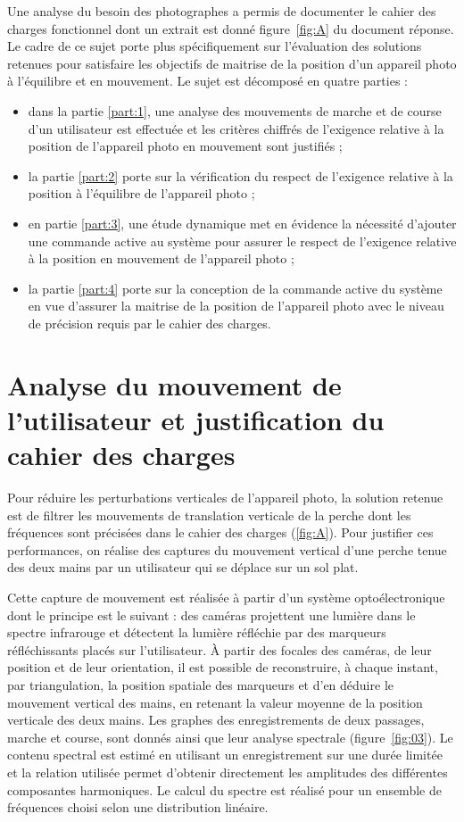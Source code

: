 Une analyse du besoin des photographes a permis de documenter le cahier des charges fonctionnel dont un extrait est donné figure~\ref{fig:A} du document réponse. Le cadre de ce sujet porte plus spécifiquement sur l'évaluation des solutions retenues pour satisfaire les objectifs de maitrise de la position d'un appareil photo à l'équilibre et en mouvement. Le sujet est décomposé en quatre parties :

\begin{itemize}
  \item dans la partie \ref{part:1}, une analyse des mouvements de marche et de course d'un utilisateur est effectuée et les critères chiffrés de l'exigence relative à la position de l'appareil photo en mouvement sont justifiés ;
  \item la partie \ref{part:2} porte sur la vérification du respect de l'exigence relative à la position à l'équilibre de l'appareil photo ;
  \item en partie \ref{part:3}, une étude dynamique met en évidence la nécessité d'ajouter une commande active au système pour assurer le respect de l'exigence relative à la position en mouvement de l'appareil photo ;
  \item la partie \ref{part:4} porte sur la conception de la commande active du système en vue d'assurer la maitrise de la position de l'appareil photo avec le niveau de précision requis par le cahier des charges.

\end{itemize}

\section{\label{part:1}Analyse du mouvement de l'utilisateur et justification du cahier des charges }
Pour réduire les perturbations verticales de l'appareil photo, la solution retenue est de filtrer les mouvements de translation verticale de la perche dont les fréquences sont précisées dans le cahier des charges (\ref{fig:A}). Pour justifier ces performances, on réalise des captures du mouvement vertical d'une perche tenue des deux mains par un utilisateur qui se déplace sur un sol plat.

Cette capture de mouvement est réalisée à partir d'un système optoélectronique dont le principe est le suivant : des caméras projettent une lumière dans le spectre infrarouge et détectent la lumière réfléchie par des marqueurs réfléchissants placés sur l'utilisateur. À partir des focales des caméras, de leur position et de leur orientation, il est possible de reconstruire, à chaque instant, par triangulation, la position spatiale des marqueurs et d'en déduire le mouvement vertical des mains, en retenant la valeur moyenne de la position verticale des deux mains. Les graphes des enregistrements de deux passages, marche et course, sont donnés ainsi que leur analyse spectrale (figure~\ref{fig:03}). Le contenu spectral est estimé en utilisant un enregistrement sur une durée limitée et la relation utilisée permet d'obtenir directement les amplitudes des différentes composantes harmoniques. Le calcul du spectre est réalisé pour un ensemble de fréquences choisi selon une distribution linéaire.


